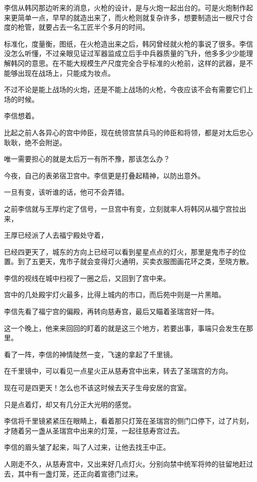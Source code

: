 李信从韩冈那边听来的消息，火枪的设计，是与火炮一起出台的。可是火炮制作起来更简单一点，早早的就造出来了，而火枪则就复杂许多，想要制造出一根尺寸合度的枪管，就要占去一名工匠半个多月的时间。

标准化，度量衡，图纸，在火枪造出来之后，韩冈曾经就火枪的事说了很多。李信没怎么听懂，不过亲眼见证过军器监成立后手中兵器质量的飞升，他多多少少能理解韩冈的意思。在不能大规模生产尺度完全合乎标准的火枪前，这样的武器，是不能够出现在战场上，只能成为妆点。

不过不论是能上战场的火炮，还是不能上战场的火枪，今夜应该不会有需要它们上场的时候。

李信想着。

比起之前人各异心的宫中帅臣，现在统领宫禁兵马的帅臣和将领，都是对太后忠心耿耿，绝不会附逆。

唯一需要担心的就是太后万一有所不豫，那该怎么办？

今夜，自己的表弟宿卫宫中。李信更是打叠起精神，以防出意外。

一旦有变，该听谁的话，他可不会弄错。

之前李信就与王厚约定了信号，一旦宫中有变，立刻就率人将韩冈从福宁宫拉出来，

王厚已经派了人去福宁殿处守着，

已经四更天了，城东的方向上已经可以看到星星点点的灯火，那里是鬼市子的位置。到了五更天，鬼市子就会变得灯火通明，买卖衣服图画花环之类，至晓方散。

李信的视线在城中扫视了一圈之后，又回到了宫中来。

宫中的几处殿宇灯火最多，比得上城内的市口，而后苑中则是一片黑暗。

李信先看了福宁宫的偏殿，再转向慈寿宫，最后又瞄着圣瑞宫好一阵。

这一个晚上，他来来回回的盯着的就是这三个地方，若要出事，事端只会发生在那里。

看了一阵，李信的神情陡然一变，飞速的拿起了千里镜。

在千里镜中，可以看见一点星火正从慈寿宫中出来，转去了圣瑞宫的方向。

现在可是四更天！怎么也不该这时候去天子生母安居的宫室。

只是点着灯，却又有几分正大光明的感觉。

李信将千里镜紧紧压在眼睛上，看着那只灯笼在圣瑞宫的侧门口停下，过了片刻，才随着另一盏从圣瑞宫中出来的灯笼，一起往慈寿宫过去。

李信的眉头皱了起来，叫了人过来，让他去找王中正。

人刚走不久，从慈寿宫中，又出来好几点灯火。分别向禁中统军将帅的驻留地赶过去，其中有一盏灯笼，还正向着宣德门过来。

